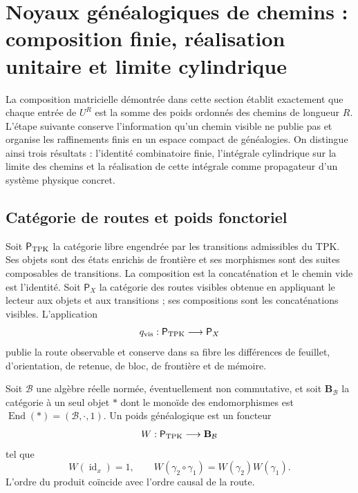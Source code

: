 \section{Noyaux généalogiques de chemins : composition finie, réalisation unitaire et limite cylindrique}
\label{x_reciprocidad:sec:integral-genealogica-caminos-rev2}

La composition matricielle démontrée dans cette section établit exactement que chaque entrée de \(U^R\) est la somme des poids ordonnés des chemins de longueur \(R\). L'étape suivante conserve l'information qu'un chemin visible ne publie pas et organise les raffinements finis en un espace compact de généalogies. On distingue ainsi trois résultats : l'identité combinatoire finie, l'intégrale cylindrique sur la limite des chemins et la réalisation de cette intégrale comme propagateur d'un système physique concret.

\subsection{Catégorie de routes et poids fonctoriel}

Soit \(\mathsf P_{\rm TPK}\) la catégorie libre engendrée par les transitions
admissibles du TPK. Ses objets sont des états enrichis de frontière et ses
morphismes sont des suites composables de transitions. La composition est la
concaténation et le chemin vide est l’identité. Soit \(\mathsf P_X\)
la catégorie des routes visibles obtenue en appliquant le lecteur aux
objets et aux transitions ; ses compositions sont les concaténations visibles.
L’application
\[
 q_{\rm vis}:\mathsf P_{\rm TPK}\longrightarrow\mathsf P_X
\]
publie la route observable et conserve dans sa fibre les différences de feuillet,
d’orientation, de retenue, de bloc, de frontière et de mémoire.


\begin{definition}
\label{x_reciprocidad:def:peso-genealogico-caminos-rev2}
Soit \(\mathcal B\) une algèbre réelle normée, éventuellement non commutative, et
soit \(\mathbf B_{\mathcal B}\) la catégorie à un seul objet \(\ast\) dont le
monoïde des endomorphismes est
\(\operatorname{End}(\ast)=(\mathcal B,\cdot,1)\). Un poids généalogique est un foncteur
\[
 W:\mathsf P_{\rm TPK}\longrightarrow\mathbf B_{\mathcal B}
\]
tel que
\[
 W(\operatorname{id}_x)=1,
 \qquad
 W(\gamma_2\circ\gamma_1)=W(\gamma_2)W(\gamma_1).
\]
L’ordre du produit coïncide avec l’ordre causal de la route.
\end{definition}

